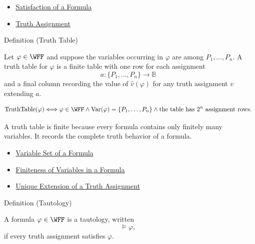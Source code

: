 \begin{dependencies}
\begin{itemize}
  \item \hyperref[def:satisfaction-propositional-formula]{Satisfaction of a Formula}
  \item \hyperref[def:truth-assignment-propositional-logic]{Truth Assignment}
\end{itemize}
\end{dependencies}
\begin{definitionbox}{Definition (Truth Table)}
\begin{definition}
\label{def:truth-table-propositional-logic}
Let \(\varphi\in\WFF\) and suppose the variables occurring in \(\varphi\) are among \(P_1,\ldots,P_n\). A truth table for \(\varphi\) is a finite table with one row for each assignment
\[
a:\{P_1,\ldots,P_n\}\to\mathbb{B}
\]
and a final column recording the value of \(\widehat v(\varphi)\) for any truth assignment \(v\) extending \(a\).
\end{definition}
\end{definitionbox}

\begin{remark*}
\[
\operatorname{TruthTable}(\varphi)
\Longleftrightarrow
\varphi\in\WFF
\land
\operatorname{Var}(\varphi)=\{P_1,\ldots,P_n\}
\land
\text{the table has }2^n\text{ assignment rows}.
\]
\end{remark*}

\begin{remark*}[Interpretation]
A truth table is finite because every formula contains only finitely many variables. It records the complete truth behavior of a formula.
\end{remark*}

\begin{dependencies}
\begin{itemize}
  \item \hyperref[def:formula-variable-set-propositional-logic]{Variable Set of a Formula}
  \item \hyperref[lem:finiteness-of-variables-propositional-formulas]{Finiteness of Variables in a Formula}
  \item \hyperref[thm:unique-extension-truth-assignment-propositional-logic]{Unique Extension of a Truth Assignment}
\end{itemize}
\end{dependencies}
\begin{definitionbox}{Definition (Tautology)}
\begin{definition}[Tautology]
\label{def:tautology-propositional-logic}
A formula \(\varphi\in\WFF\) is a tautology, written
\[
\models\varphi,
\]
if every truth assignment satisfies \(\varphi\).
\end{definition}
\end{definitionbox}

